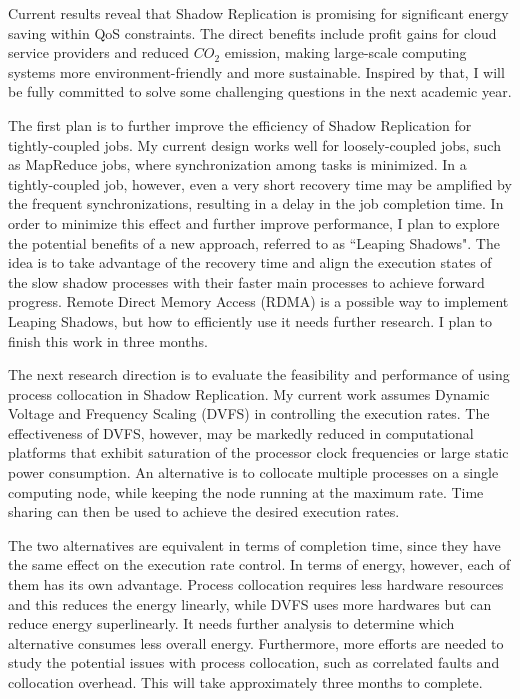 Current results reveal that Shadow Replication is promising for significant energy saving within QoS constraints. The direct benefits include profit gains for cloud service providers and reduced $CO_2$ emission, making large-scale computing systems more environment-friendly and more sustainable. Inspired by that, I will be fully committed to solve some challenging questions in the next academic year.

The first plan is to further improve the efficiency of Shadow Replication for tightly-coupled jobs. My current design works well for loosely-coupled jobs, such as MapReduce jobs, where synchronization among tasks is minimized. 
 In a tightly-coupled job, however, even a very short recovery time may be amplified by the frequent synchronizations,  
 resulting in a delay in the job completion time. In order to minimize this effect and further improve performance, I plan to explore the potential benefits of a new approach, referred to as ``Leaping Shadows". The idea is to take advantage of the recovery time and align the execution states of the slow shadow processes with their faster main processes to achieve forward progress. Remote Direct Memory Access (RDMA) is a possible way to implement Leaping Shadows, but how to efficiently use it needs further research. I plan to finish this work in three months. 

The next research direction is to evaluate the feasibility and performance of using process collocation in Shadow Replication. My current work assumes Dynamic Voltage and Frequency Scaling (DVFS) in controlling the execution rates. The effectiveness of DVFS, however, may be markedly reduced in computational platforms that exhibit saturation of the processor clock frequencies or large static power consumption. An alternative is to collocate multiple processes on a single computing node, while keeping the node running at the maximum rate. Time sharing can then be used to achieve the desired execution rates.

The two alternatives are equivalent in terms of completion time, since they have the same effect on the execution rate control. In terms of energy, however, each of them has its own advantage. Process collocation requires less hardware resources and this reduces the energy linearly, while DVFS uses more hardwares but can reduce energy superlinearly. It needs further analysis to determine which alternative consumes less overall energy. Furthermore, more efforts are needed to study the potential issues with process collocation, such as correlated faults and collocation overhead. This will take approximately three months to complete. 

